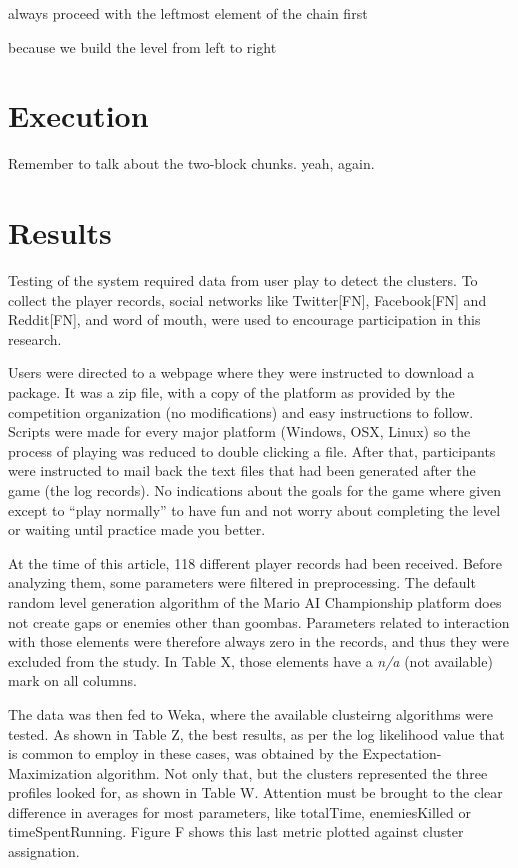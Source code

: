\documentclass[conference]{IEEEtran}
\begin{document}
always proceed with the leftmost element of the chain first

because we build the level from left to right

\section{Execution}

Remember to talk about the two-block chunks. yeah, again.

\section{Results}

Testing of the system required data from user play to detect the clusters. To collect the player records, social networks like Twitter[FN], Facebook[FN] and Reddit[FN], and word of mouth, were used to encourage participation in this research.

Users were directed to a webpage where they were instructed to download a package. It was a zip file, with a copy of the platform as provided by the competition organization (no modifications) and easy instructions to follow. Scripts were made for every major platform (Windows, OSX, Linux) so the process of playing was reduced to double clicking a file. After that, participants were instructed to mail back the text files that had been generated after the game (the log records). No indications about the goals for the game where given except to ``play normally'' to have fun and not worry about completing the level or waiting until practice made you better.

At the time of this article, 118 different player records had been received. Before analyzing them, some parameters were filtered in preprocessing. The default random level generation algorithm of the Mario AI Championship platform does not create gaps or enemies other than goombas. Parameters related to interaction with those elements were therefore always zero in the records, and thus they were excluded from the study. In Table X, those elements have a \textit{n/a} (not available) mark on all columns.

The data was then fed to Weka, where the available clusteirng algorithms were tested. As shown in Table Z, the best results, as per the log likelihood value that is common to employ in these cases, was obtained by the Expectation-Maximization algorithm. Not only that, but the clusters represented the three profiles looked for, as shown in Table W. Attention must be brought to the clear difference in averages for most parameters, like totalTime, enemiesKilled or timeSpentRunning. Figure F shows this last metric plotted against cluster assignation.
\end{document}
